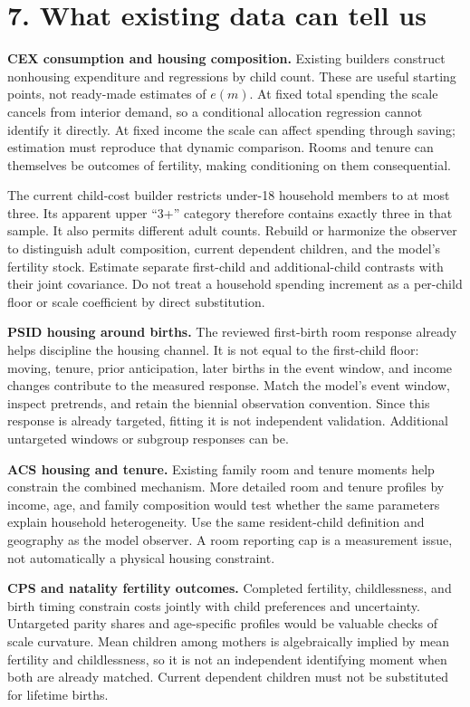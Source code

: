 \documentclass[11pt,letterpaper]{article}
\newcommand{\page}[1]{\newpage\section*{#1}}
\begin{document}
\page{7. What existing data can tell us}
\textbf{CEX consumption and housing composition.} Existing builders construct nonhousing expenditure and regressions by child count. These are useful starting points, not ready-made estimates of $e(m)$. At fixed total spending the scale cancels from interior demand, so a conditional allocation regression cannot identify it directly. At fixed income the scale can affect spending through saving; estimation must reproduce that dynamic comparison. Rooms and tenure can themselves be outcomes of fertility, making conditioning on them consequential.

The current child-cost builder restricts under-18 household members to at most three. Its apparent upper ``3+'' category therefore contains exactly three in that sample. It also permits different adult counts. Rebuild or harmonize the observer to distinguish adult composition, current dependent children, and the model's fertility stock. Estimate separate first-child and additional-child contrasts with their joint covariance. Do not treat a household spending increment as a per-child floor or scale coefficient by direct substitution.

\textbf{PSID housing around births.} The reviewed first-birth room response already helps discipline the housing channel. It is not equal to the first-child floor: moving, tenure, prior anticipation, later births in the event window, and income changes contribute to the measured response. Match the model's event window, inspect pretrends, and retain the biennial observation convention. Since this response is already targeted, fitting it is not independent validation. Additional untargeted windows or subgroup responses can be.

\textbf{ACS housing and tenure.} Existing family room and tenure moments help constrain the combined mechanism. More detailed room and tenure profiles by income, age, and family composition would test whether the same parameters explain household heterogeneity. Use the same resident-child definition and geography as the model observer. A room reporting cap is a measurement issue, not automatically a physical housing constraint.

\textbf{CPS and natality fertility outcomes.} Completed fertility, childlessness, and birth timing constrain costs jointly with child preferences and uncertainty. Untargeted parity shares and age-specific profiles would be valuable checks of scale curvature. Mean children among mothers is algebraically implied by mean fertility and childlessness, so it is not an independent identifying moment when both are already matched. Current dependent children must not be substituted for lifetime births.
\end{document}
